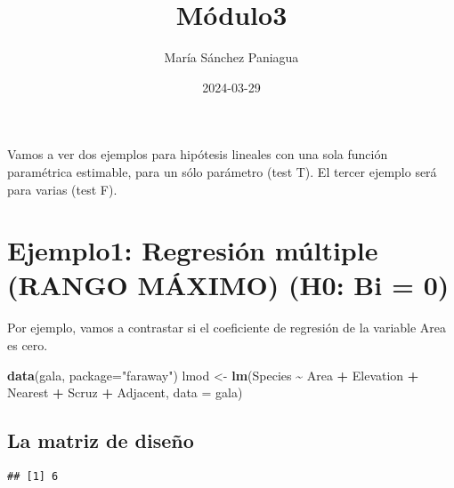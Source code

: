 \documentclass[
]{article}
\title{Módulo3}
\author{María Sánchez Paniagua}
\date{2024-03-29}
\newenvironment{Shaded}{\begin{snugshade}}{\end{snugshade}}
\newcommand{\AttributeTok}[1]{\textcolor[rgb]{0.13,0.29,0.53}{#1}}
\newcommand{\CommentTok}[1]{\textcolor[rgb]{0.56,0.35,0.01}{\textit{#1}}}
\newcommand{\FunctionTok}[1]{\textcolor[rgb]{0.13,0.29,0.53}{\textbf{#1}}}
\newcommand{\NormalTok}[1]{#1}
\newcommand{\OtherTok}[1]{\textcolor[rgb]{0.56,0.35,0.01}{#1}}
\newcommand{\SpecialCharTok}[1]{\textcolor[rgb]{0.81,0.36,0.00}{\textbf{#1}}}
\newcommand{\StringTok}[1]{\textcolor[rgb]{0.31,0.60,0.02}{#1}}
\begin{document}
\maketitle

Vamos a ver dos ejemplos para hipótesis lineales con una sola función
paramétrica estimable, para un sólo parámetro (test T). El tercer
ejemplo será para varias (test F).

\hypertarget{ejemplo1-regresiuxf3n-muxfaltiple-rango-muxe1ximo-h0-bi-0}{%
\section{Ejemplo1: Regresión múltiple (RANGO MÁXIMO) (H0: Bi =
0)}\label{ejemplo1-regresiuxf3n-muxfaltiple-rango-muxe1ximo-h0-bi-0}}

Por ejemplo, vamos a contrastar si el coeficiente de regresión de la
variable Area es cero.

\begin{Shaded}
\begin{Highlighting}[]
\FunctionTok{data}\NormalTok{(gala, }\AttributeTok{package=}\StringTok{"faraway"}\NormalTok{)}
\NormalTok{lmod }\OtherTok{\textless{}{-}} \FunctionTok{lm}\NormalTok{(Species }\SpecialCharTok{\textasciitilde{}}\NormalTok{ Area }\SpecialCharTok{+}\NormalTok{ Elevation }\SpecialCharTok{+}\NormalTok{ Nearest }\SpecialCharTok{+}\NormalTok{ Scruz }\SpecialCharTok{+}\NormalTok{ Adjacent,}
\AttributeTok{data =}\NormalTok{ gala)}
\end{Highlighting}
\end{Shaded}

\hypertarget{la-matriz-de-diseuxf1o}{%
\subsection{La matriz de diseño}\label{la-matriz-de-diseuxf1o}}

\begin{Shaded}
\end{Shaded}

\begin{verbatim}
## [1] 6
\end{verbatim}
\end{document}
